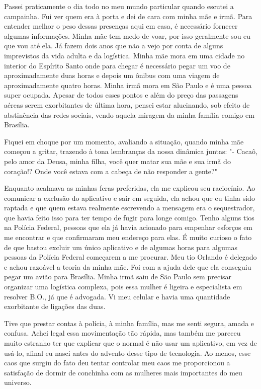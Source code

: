 Passei praticamente o dia todo no meu mundo particular quando escutei a campainha. Fui ver quem era à porta e dei de cara com minha mãe e irmã. Para entender melhor o peso dessas presenças aqui em casa, é necessário fornecer algumas informações. Minha mãe tem medo de voar, por isso geralmente sou eu que vou até ela. Já fazem dois anos que não a vejo por conta de alguns imprevistos da vida adulta e da logística. Minha mãe mora em uma cidade no interior do Espírito Santo onde para chegar é necessário pegar um voo de aproximadamente duas horas e depois um ônibus com uma viagem de aproximadamente quatro horas. Minha irmã mora em São Paulo e é uma pessoa super ocupada. Apesar de todos esses pontos e além do preço das passagens aéreas serem exorbitantes de última hora, pensei estar alucinando, sob efeito de abstinência das redes sociais, vendo aquela miragem da minha família comigo em Brasília.

Fiquei em choque por um momento, avaliando a situação, quando minha mãe começou a gritar, trazendo à tona lembranças da nossa dinâmica juntas: "- Cacaô, pelo amor da Deusa, minha filha, você quer matar sua mãe e sua irmã do coração!? Onde você estava com a cabeça de não responder a gente?"

Enquanto acalmava as minhas feras preferidas, ela me explicou seu raciocínio. Ao comunicar a exclusão do aplicativo e sair em seguida, ela achou que eu tinha sido raptada e que quem estava realmente escrevendo a mensagem era o sequestrador, que havia feito isso para ter tempo de fugir para longe comigo. Tenho alguns tios na Polícia Federal, pessoas que ela já havia acionado para empenhar esforços em me encontrar e que confirmaram meu endereço para elas.  É muito curioso o fato de que bastou excluir um único aplicativo e de algumas horas para algumas pessoas da Polícia Federal começarem a me procurar. Meu tio Orlando é delegado e achou razoável a teoria da minha mãe. Foi com a ajuda dele que ela conseguiu pegar um avião para Brasília. Minha irmã saiu de São Paulo sem precisar organizar uma logística complexa, pois essa mulher é ligeira e especialista em resolver B.O., já que é advogada. Vi meu celular e havia uma quantidade exorbitante de ligações das duas.


Tive que prestar contas à polícia, à minha família, mas me senti segura, amada e confusa. Achei legal essa movimentação tão rápida, mas também me pareceu muito estranho ter que explicar que o normal é não usar um aplicativo, em vez de usá-lo, afinal eu nasci antes do advento desse tipo de tecnologia. Ao menos, esse caos que surgiu do fato deu tentar controlar meu caos me proporcionou a satisfação de dormir de conchinha com as mulheres mais importantes do meu universo.
